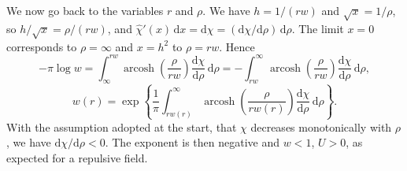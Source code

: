 \begin{problem}[title={Repulsive field from cross-section (Firsov)}]
{We now go back to the variables $r$ and $\rho$. We have $h = 1/(rw)$ and $\sqrt{x} = 1/\rho$, so $h/\sqrt{x} = \rho/(rw)$, and $\widehat{\chi}'(x)\,\mathrm{d}x = \mathrm{d}\chi = (\mathrm{d}\chi/\mathrm{d}\rho)\,\mathrm{d}\rho$. The limit $x = 0$ corresponds to $\rho = \infty$ and $x = h^2$ to $\rho = rw$. Hence
\begin{equation*}
    -\pi\log{w} = \int_\infty^{rw} \operatorname{arcosh}\left( \frac{\rho}{rw} \right)\frac{\mathrm{d}\chi}{\mathrm{d}\rho}\,\mathrm{d}\rho = -\int_{rw}^\infty \operatorname{arcosh}\left( \frac{\rho}{rw} \right)\frac{\mathrm{d}\chi}{\mathrm{d}\rho}\,\mathrm{d}\rho,
\end{equation*}
\ie
\begin{equation*}
    w(r) = \exp{\left\{ \frac{1}{\pi}\int_{rw(r)}^\infty \operatorname{arcosh}\left( \frac{\rho}{rw(r)} \right)\frac{\mathrm{d}\chi}{\mathrm{d}\rho}\,\mathrm{d}\rho \right\}}.
\end{equation*}
With the assumption adopted at the start, that $\chi$ decreases monotonically with $\rho$, we have $\mathrm{d}\chi/\mathrm{d}\rho < 0$. The exponent is then negative and $w < 1$, \ie $U > 0$, as expected for a repulsive field.

}
\end{problem}

